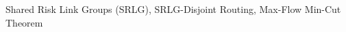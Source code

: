 \maketitle


\begin{IEEEkeywords}
Shared Risk Link Groups (SRLG), SRLG-Disjoint Routing, Max-Flow Min-Cut Theorem
\end{IEEEkeywords}
















%
%
%
%
%
%
%
%
%
%





%
%
